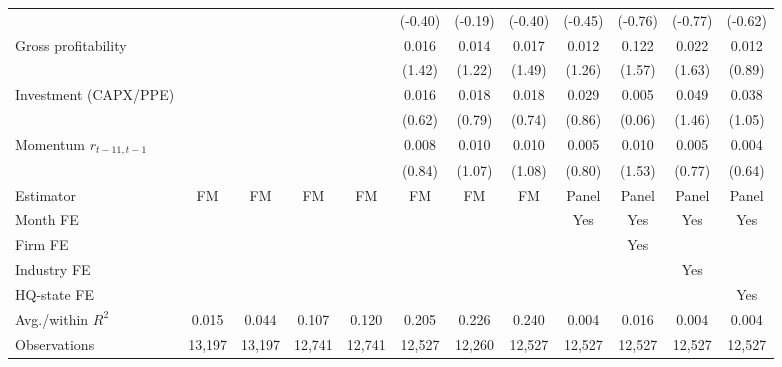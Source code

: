 \begin{table}
\begin{tabular*}{\linewidth}{@{\extracolsep{\fill}}lccccccccccc}
 &  &  &  &  & (-0.40) & (-0.19) & (-0.40) & (-0.45) & (-0.76) & (-0.77) & (-0.62) \\
Gross profitability &  &  &  &  & 0.016 & 0.014 & 0.017 & 0.012 & 0.122 & 0.022 & 0.012 \\
 &  &  &  &  & (1.42) & (1.22) & (1.49) & (1.26) & (1.57) & (1.63) & (0.89) \\
Investment (CAPX/PPE) &  &  &  &  & 0.016 & 0.018 & 0.018 & 0.029 & 0.005 & 0.049 & 0.038 \\
 &  &  &  &  & (0.62) & (0.79) & (0.74) & (0.86) & (0.06) & (1.46) & (1.05) \\
Momentum $r_{t-11,t-1}$ &  &  &  &  & 0.008 & 0.010 & 0.010 & 0.005 & 0.010 & 0.005 & 0.004 \\
 &  &  &  &  & (0.84) & (1.07) & (1.08) & (0.80) & (1.53) & (0.77) & (0.64) \\
\addlinespace
Estimator & FM & FM & FM & FM & FM & FM & FM & Panel & Panel & Panel & Panel \\
Month FE &  &  &  &  &  &  &  & Yes & Yes & Yes & Yes \\
Firm FE &  &  &  &  &  &  &  &  & Yes &  &  \\
Industry FE &  &  &  &  &  &  &  &  &  & Yes &  \\
HQ-state FE &  &  &  &  &  &  &  &  &  &  & Yes \\
Avg./within $R^2$ & 0.015 & 0.044 & 0.107 & 0.120 & 0.205 & 0.226 & 0.240 & 0.004 & 0.016 & 0.004 & 0.004 \\
Observations & 13,197 & 13,197 & 12,741 & 12,741 & 12,527 & 12,260 & 12,527 & 12,527 & 12,527 & 12,527 & 12,527 \\
\bottomrule
\end{tabular*}

\end{table}
